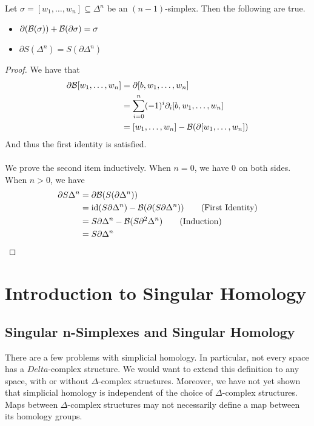 \documentclass[a4paper]{article}
\begin{document}
\begin{lmm}{}{} Let $\sigma=[w_1,\dots,w_n]\subseteq\Delta^n$ be an $(n-1)$-simplex. Then the following are true. 
\begin{itemize}
\item $\partial(\mathcal{B}(\sigma))+\mathcal{B}(\partial\sigma)=\sigma$ 
\item $\partial S(\Delta^n)=S(\partial\Delta^n)$
\end{itemize} \tcbline
\begin{proof}
We have that 
\begin{align*}
\partial\mathcal{B}[w_1,\dots,w_n]&=\partial[b,w_1,\dots,w_n]\\
&=\sum_{i=0}^n(-1)^i\partial_i[b,w_1,\dots,w_n]\\
&=[w_1,\dots,w_n]-\mathcal{B}(\partial[w_1,\dots,w_n])
\end{align*}
And thus the first identity is satisfied. \\~\\
We prove the second item inductively. When $n=0$, we have $0$ on both sides. When $n>0$, we have
\begin{align*}
\partial S\Delta^n&=\partial\mathcal{B}(S(\partial\Delta^n))\\
&=\text{id}(S\partial\Delta^n)-\mathcal{B}(\partial(S\partial\Delta^n))\tag{First Identity}\\
&=S\partial\Delta^n-\mathcal{B}(S\partial^2\Delta^n)\tag{Induction}\\
&=S\partial\Delta^n
\end{align*}
\end{proof}
\end{lmm}

\pagebreak
\section{Introduction to Singular Homology}
\subsection{Singular n-Simplexes and Singular Homology}
There are a few problems with simplicial homology. In particular, not every space has a $Delta$-complex structure. We would want to extend this definition to any space, with or without $\Delta$-complex structures. Moreover, we have not yet shown that simplicial homology is independent of the choice of $\Delta$-complex structures. Maps between $\Delta$-complex structures may not necessarily define a map between its homology groups. \\~\\
\end{document}
